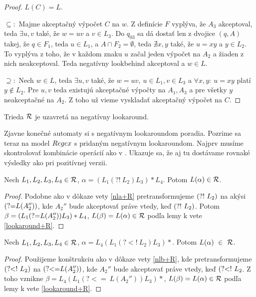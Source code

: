 \begin{proof}
$L(C)=L.$

$\subseteq:$
Majme akceptačný výpočet $C$ na $w$. Z definície $F$ vyplýva, že $A_3$ akceptoval, teda $\exists u,v$ také, že $w=uv$ a $v \in L_3$. Do $q_{03}$ sa dá dostať len z dvojice $(q,A)$ takej, že $q\in F_1$, teda $u\in L_1$, a $A \cap F_2 = \emptyset$, teda $\nexists x,y$ také, že $u=xy$ a $y \in L_2$. To vyplýva z toho, že v každom znaku $u$ začal jeden výpočet na $A_2$ a žiaden z nich neakceptoval. Teda negatívny lookbehind akceptoval a $w\in L$.

$\supseteq:$
Nech $w\in L$, teda $\exists u,v$ také, že $w=uv,~ u \in L_1, v\in L_3$ a $\forall x,y:~u=xy$ platí $y \notin L_2$. Pre $u,v$ teda existujú akceptačné výpočty na $A_1,A_3$ a pre všetky $y$ neakceptačné na $A_2$. Z toho už vieme vyskladať akceptačný výpočet na $C$.
\end{proof}

\begin{veta}
Trieda ${\cal R}$ je uzavretá na negatívny lookaround.
\end{veta}

Zjavne konečné automaty si s negatívnym lookaroundom poradia. Pozrime sa teraz na model $Regex$ s pridaným negatívnym lookaroundom. Najprv musíme skontrolovať kombinácie operácií ako v \cite[Lema. 2.2.8. a 2.2.9]{mojaBak}. Ukazuje sa, že aj tu dostávame rovnaké výsledky ako pri pozitívnej verzii.

\begin{lema}\label{nla*}
Nech $L_1,L_2,L_3,L_4 \in {\cal R}$, $\alpha = \left( L_1 \left( ?!~ L_2\right) L_3 \right) * L_4$. Potom $L(\alpha) \in {\cal R}$.
\end{lema} 
\begin{proof}
Podobne ako v dôkaze vety \ref{nla+R} pretransformujeme $\text{(?!~} L_2)$ na akýsi $\text{(?=} L(A_2''))$, kde $A_2''$ bude akceptovať práve vtedy, keď $\text{(?!~} L_2)$. Potom $\beta = \left( L_1 \text{(?=} L(A_2'') ) L_3 \right) * L_4$, $L(\beta) = L(\alpha) \in {\cal R}$ podľa lemy k vete \ref{lookaround+R}.
\end{proof}

\begin{lema}\label{nlb*}
Nech $L_1,L_2,L_3,L_4 \in {\cal R}$, $\alpha = L_4 \left( L_1 \left(?<!~ L_2\right) L_3 \right) *$. Potom $L(\alpha)~\in~{\cal R}$.
\end{lema} 
\begin{proof}
Použijeme konštrukciu ako v dôkaze vety \ref{nlb+R}, kde pretransformujeme $\text{(?\textless !~} L_2)$ na $\text{(?\textless =} L(A_2''))$, kde $A_2''$ bude akceptovať práve vtedy, keď $\text{(?\textless !~} L_2$. Z toho vznikne $\beta = L_4 \left( L_1 \left(?<=~ L(A_2'')\right) L_3 \right) *$, $L(\beta) = L(\alpha) \in {\cal R}$ podľa lemy k vete \ref{lookaround+R}.
\end{proof}

